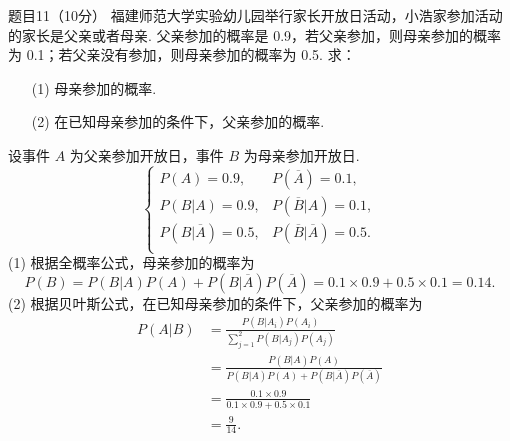 \documentclass{article}
\begin{document}
\begin{question}{题目11（10分）}
    福建师范大学实验幼儿园举行家长开放日活动，小浩家参加活动的家长是父亲或者母亲. 父亲参加的概率是 0.9，若父亲参加，则母亲参加的概率为 0.1；若父亲没有参加，则母亲参加的概率为 0.5. 求：

    \begin{itemize}
        \item [(1)] 母亲参加的概率.
        \item [(2)] 在已知母亲参加的条件下，父亲参加的概率.
    \end{itemize}
\end{question}
\begin{solution}
    设事件 $A$ 为父亲参加开放日，事件 $B$ 为母亲参加开放日.
    $$
        \begin{cases}
            P(A) = 0.9,              & P(\overline{A}) = 0.1,              \\
            P(B|A) = 0.9,            & P(\overline{B}|A) = 0.1,            \\
            P(B|\overline{A}) = 0.5, & P(\overline{B}|\overline{A}) = 0.5. \\
        \end{cases}
    $$
    (1) 根据全概率公式，母亲参加的概率为
    $$
        P(B) = P(B|A)P(A) + P(B|\overline{A})P(\overline{A})
        = 0.1 \times 0.9 + 0.5 \times 0.1
        = 0.14.
    $$
    (2) 根据贝叶斯公式，在已知母亲参加的条件下，父亲参加的概率为
    $$
        \begin{aligned}
            P(A|B)
             & = \frac{P(B|A_i)P(A_i)}{\sum\limits_{j=1}^2 P(B|A_j)P(A_j)}        \\
             & = \frac{P(B|A)P(A)}{P(B|A)P(A) + P(B|\overline{A})P(\overline{A})} \\
             & = \frac{0.1 \times 0.9}{0.1 \times 0.9 + 0.5 \times 0.1}           \\
             & = \frac{9}{14}.                                                    \\
        \end{aligned}
    $$
\end{solution}
\end{document}
